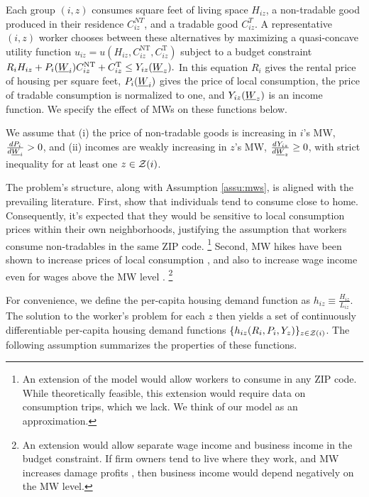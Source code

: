 Each group $(i,z)$ consumes
square feet of living space $H_{iz}$, 
a non-tradable good produced in their residence $C_{iz}^{NT}$, and
a tradable good $C_{iz}^T$.
A representative $(i,z)$ worker chooses between these alternatives by maximizing
a quasi-concave utility function 
$u_{iz} = u \left(H_{iz}, C^{\text{NT}}_{iz}, C^{\text{T}}_{iz}\right)$
subject to a budget constraint
$R_i H_{iz} + P_i(\underline{W}_i) C^{\text{NT}}_{iz} + C^{\text{T}}_{iz} \leq Y_{iz}(\underline{W}_z).$
In this equation 
$R_i$ gives the rental price of housing per square feet,
$P_i(\underline{W}_i)$ gives the price of local consumption,
the price of tradable consumption is normalized to one, and 
$Y_{iz}(\underline{W}_z)$ is an income function.
We specify the effect of MWs on these functions below.

\begin{assu}\label{assu:mws}
    We assume that
    (i) the price of non-tradable goods is increasing in $i$'s MW, 
    $\frac{d P_i}{d \underline{W}_i} > 0$, and
    (ii) incomes are weakly increasing in $z$'s MW, 
    $\frac{d Y_{iz}}{d \underline{W}_z} \geq 0$, with strict inequality 
    for at least one $z\in\mathcal{Z}(i)$.
\end{assu}

The problem's structure, along with Assumption \ref{assu:mws}, is aligned with 
the prevailing literature.
First, \textcite{MiyauchiEtAl2021} show that individuals tend to consume close 
to home.
Consequently, it's expected that they would be sensitive to local consumption 
prices within their own neighborhoods, justifying the assumption that workers 
consume non-tradables in the same ZIP code.%
\footnote{An extension of the model would allow workers to consume in any ZIP 
    code.
    While theoretically feasible, this extension would require data on 
    consumption trips, which we lack.
    We think of our model as an approximation.}
Second, MW hikes have been shown to increase prices of local consumption 
\parencite[e.g.,][]{Leung2021},
and also to increase wage income even for wages above the MW level 
\parencite[e.g.,][]{CegnizEtAl2019, Dube2019Income}.%
\footnote{An extension would allow separate wage income and business income in 
the budget constraint.
If firm owners tend to live where they work, and MW increases damage profits
\parencite[as found by, e.g.,][]{DracaMachinVanreenen2011, HarasztosiLidner2019},
then business income would depend negatively on the MW level.}

For convenience, we define the per-capita housing demand function as 
$h_{iz} \equiv \frac{H_{iz}}{L_{iz}}$.
The solution to the worker's problem for each $z$ then yields a set of 
continuously differentiable per-capita housing demand functions 
$\{h_{iz} (R_i, P_i, Y_z)\}_{z\in\mathcal{Z}(i)}$.
The following assumption summarizes the properties of these functions.

